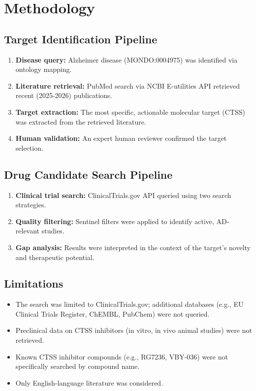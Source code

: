 \documentclass[11pt, a4paper]{article}
\begin{document}
\section{Methodology}

\subsection{Target Identification Pipeline}

\begin{enumerate}
    \item \textbf{Disease query:} Alzheimer disease (MONDO:0004975) was identified via ontology mapping.
    \item \textbf{Literature retrieval:} PubMed search via NCBI E-utilities API retrieved recent (2025-2026) publications.
    \item \textbf{Target extraction:} The most specific, actionable molecular target (CTSS) was extracted from the retrieved literature.
    \item \textbf{Human validation:} An expert human reviewer confirmed the target selection.
\end{enumerate}

\subsection{Drug Candidate Search Pipeline}

\begin{enumerate}
    \item \textbf{Clinical trial search:} ClinicalTrials.gov API queried using two search strategies.
    \item \textbf{Quality filtering:} Sentinel filters were applied to identify active, AD-relevant studies.
    \item \textbf{Gap analysis:} Results were interpreted in the context of the target's novelty and therapeutic potential.
\end{enumerate}

\subsection{Limitations}

\begin{itemize}
    \item The search was limited to ClinicalTrials.gov; additional databases (e.g., EU Clinical Trials Register, ChEMBL, PubChem) were not queried.
    \item Preclinical data on CTSS inhibitors (in vitro, in vivo animal studies) were not retrieved.
    \item Known CTSS inhibitor compounds (e.g., RG7236, VBY-036) were not specifically searched by compound name.
    \item Only English-language literature was considered.
\end{itemize}
\end{document}
